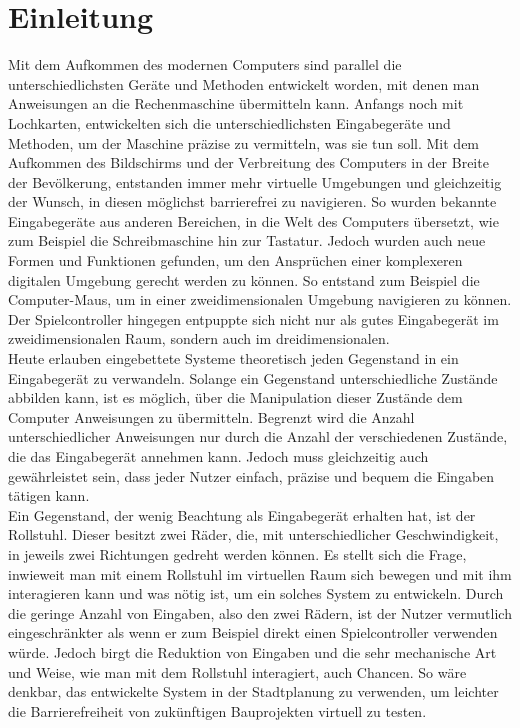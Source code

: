 \chapter{Einleitung}
Mit dem Aufkommen des modernen Computers sind parallel die unterschiedlichsten Geräte und Methoden entwickelt worden, mit denen man Anweisungen an die Rechenmaschine übermitteln kann.
Anfangs noch mit Lochkarten, entwickelten sich die unterschiedlichsten Eingabegeräte und Methoden, um der Maschine präzise zu vermitteln, was sie tun soll.
Mit dem Aufkommen des Bildschirms und der Verbreitung des Computers in der Breite der Bevölkerung, entstanden immer mehr virtuelle Umgebungen und gleichzeitig der Wunsch, in diesen möglichst barrierefrei zu navigieren.
So wurden bekannte Eingabegeräte aus anderen Bereichen, in die Welt des Computers übersetzt, wie zum Beispiel die Schreibmaschine hin zur Tastatur.
Jedoch wurden auch neue Formen und Funktionen gefunden, um den Ansprüchen einer komplexeren digitalen Umgebung gerecht werden zu können.
So entstand zum Beispiel die Computer-Maus, um in einer zweidimensionalen Umgebung navigieren zu können.
Der Spielcontroller hingegen entpuppte sich nicht nur als gutes Eingabegerät im zweidimensionalen Raum, sondern auch im dreidimensionalen.\\
Heute erlauben eingebettete Systeme theoretisch jeden Gegenstand in ein Eingabegerät zu verwandeln.
Solange ein Gegenstand unterschiedliche Zustände abbilden kann, ist es möglich, über die Manipulation dieser Zustände dem Computer Anweisungen zu übermitteln.
Begrenzt wird die Anzahl unterschiedlicher Anweisungen nur durch die Anzahl der verschiedenen Zustände, die das Eingabegerät annehmen kann.
Jedoch muss gleichzeitig auch gewährleistet sein, dass jeder Nutzer einfach, präzise und bequem die Eingaben tätigen kann.\\
Ein Gegenstand, der wenig Beachtung als Eingabegerät erhalten hat, ist der Rollstuhl.
Dieser besitzt zwei Räder, die, mit unterschiedlicher Geschwindigkeit, in jeweils zwei Richtungen gedreht werden können.
Es stellt sich die Frage, inwieweit man mit einem Rollstuhl im virtuellen Raum sich bewegen und mit ihm interagieren kann und was nötig ist, um ein solches System zu entwickeln.
Durch die geringe Anzahl von Eingaben, also den zwei Rädern, ist der Nutzer vermutlich eingeschränkter als wenn er zum Beispiel direkt einen Spielcontroller verwenden würde.
Jedoch birgt die Reduktion von Eingaben und die sehr mechanische Art und Weise, wie man mit dem Rollstuhl interagiert, auch Chancen.
So wäre denkbar, das entwickelte System in der Stadtplanung zu verwenden, um leichter die Barrierefreiheit von zukünftigen Bauprojekten virtuell zu testen.
